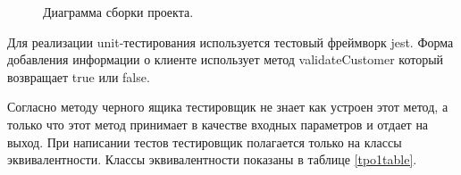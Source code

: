 \documentclass[a4paper,article,14pt]{extarticle}
\begin{document}
\begin{figure}[ht]
\begin{center}
\caption{\label{tpo1} Диаграмма сборки проекта.}
\end {center}
\end {figure}

Для реализации unit-тестирования
используется тестовый фреймворк jest. Форма добавления информации о клиенте использует
метод validateCustomer который возвращает true или false. 

Согласно методу черного ящика
тестировщик не знает как устроен этот метод, а только что этот метод принимает в качестве
входных параметров и отдает на выход. При написании тестов тестировщик полагается
только на классы эквивалентности. Классы эквивалентности показаны в таблице \ref{tpo1table}. 
\end{document}
